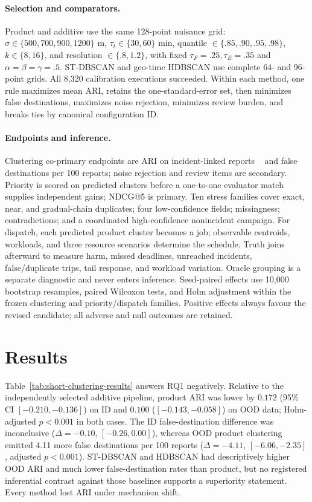 \documentclass[runningheads]{llncs}
\begin{document}
\paragraph{Selection and comparators.}
Product and additive use the same 128-point nuisance grid:
$\sigma\in\{500,700,900,1200\}$ m, $\tau_t\in\{30,60\}$ min, quantile
$\in\{.85,.90,.95,.98\}$, $k\in\{8,16\}$, and resolution
$\in\{.8,1.2\}$, with fixed $\tau_F=.25,\tau_E=.35$ and
$\alpha=\beta=\gamma=.5$. ST-DBSCAN and geo-time HDBSCAN use complete
64- and 96-point grids. All 8,320 calibration executions succeeded. Within
each method, one rule maximizes mean ARI, retains the one-standard-error set,
then minimizes false destinations, maximizes noise rejection, minimizes review
burden, and breaks ties by canonical configuration ID.

\paragraph{Endpoints and inference.}
Clustering co-primary endpoints are ARI on incident-linked reports
~\cite{hubert1985comparing} and false destinations per 100 reports; noise
rejection and review items are secondary. Priority is scored on predicted
clusters before a one-to-one evaluator match supplies independent gains;
NDCG@5 is primary. Ten stress families cover exact, near, and gradual-chain
duplicates; four low-confidence fields; missingness; contradictions; and a
coordinated high-confidence nonincident campaign. For dispatch, each predicted
product cluster becomes a job; observable centroids, workloads, and three
resource scenarios determine the schedule. Truth joins afterward to measure
harm, missed deadlines, unreached incidents, false/duplicate trips, tail
response, and workload variation. Oracle grouping is a separate diagnostic
and never enters inference. Seed-paired effects use 10,000 bootstrap resamples,
paired Wilcoxon tests, and Holm adjustment within the frozen clustering and
priority/dispatch families. Positive effects always favour the revised
candidate; all adverse and null outcomes are retained.

\section{Results}

\ShortClusteringResultsTable

Table~\ref{tab:short-clustering-results} answers RQ1 negatively. Relative to
the independently selected additive pipeline, product ARI was lower by
$0.172$ (95\% CI $[-0.210,-0.136]$) on ID and $0.100$
($[-0.143,-0.058]$) on OOD data; Holm-adjusted $p<0.001$ in both cases.
The ID false-destination difference was inconclusive
($\Delta=-0.10$, $[-0.26,0.00]$), whereas OOD product clustering emitted
4.11 more false destinations per 100 reports
($\Delta=-4.11$, $[-6.06,-2.35]$, adjusted $p<0.001$). ST-DBSCAN and HDBSCAN
had descriptively higher OOD ARI and much lower false-destination rates than
product, but no registered inferential contrast against those baselines
supports a superiority statement. Every method lost ARI under mechanism shift.
\end{document}
